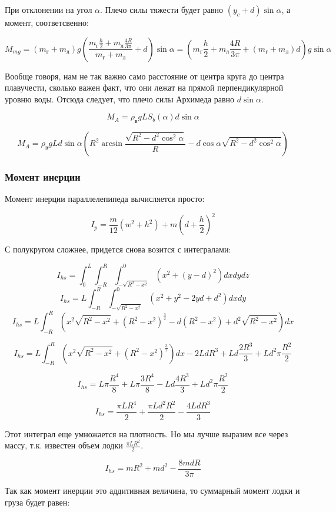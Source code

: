 \documentclass[12pt,a4paper]{article}
\begin{document}
При отклонении на угол $\alpha$. Плечо силы тяжести будет равно $(y_c+d)\sin\alpha$, а момент, соответсвенно:

$$ M_{mg} = (m_\text{г} + m_\text{л})g (\frac{m_\text{г}\frac{h}{2} + m_\text{л}\frac{4R}{3\pi}}{m_\text{г} + m_\text{л}} + d) \sin\alpha = (m_\text{г}\frac{h}{2} + m_\text{л}\frac{4R}{3\pi} + (m_\text{г} + m_\text{л})d)g\sin\alpha $$

Вообще говоря, нам не так важно само расстояние от центра круга до центра плавучести, сколько важен факт, что они лежат на прямой перпендикулярной уровню воды. Отсюда следует, что плечо силы Архимеда равно $d\sin\alpha$.

$$ M_A = \rho_\text{в}gLS_b(\alpha)d\sin\alpha $$

$$ M_A = \rho_\text{в}gLd\sin\alpha (R^2 \arcsin\frac{\sqrt{R^2-d^2\cos^2\alpha}}{R} - d\cos\alpha\sqrt{R^2-d^2\cos^2\alpha}) $$

\subsubsection{Момент инерции}

Момент инерции параллелепипеда вычисляется просто:

$$ I_p = \frac{m}{12}(w^2 + h^2) + m(d + \frac{h}{2})^2 $$

С полукругом сложнее, придется снова возится с интегралами:

$$ I_{hs} = \int_0^L \int_{-R}^{R} \int_{-\sqrt{R^2 - x^2}}^0 (x^2 + (y-d)^2) dx dy dz $$
$$ I_{hs} = L \int_{-R}^{R} \int_{-\sqrt{R^2 - x^2}}^0 (x^2 + y^2 -2yd + d^2) dx dy $$
$$ I_{hs} = L \int_{-R}^{R} (x^2 \sqrt{R^2 - x^2} + (R^2 - x^2)^\frac{3}{2} - d(R^2 - x^2) + d^2 \sqrt{R^2 - x^2}) dx $$

$$ I_{hs} = L \int_{-R}^{R} (x^2 \sqrt{R^2 - x^2} + (R^2 - x^2)^\frac{3}{2}) dx - 2LdR^3 + Ld\frac{2R^3}{3} + Ld^2\pi\frac{R^2}{2} $$

$$ I_{hs} = L\pi\frac{R^4}{8} + L\pi\frac{3R^4}{8} - Ld\frac{4R^3}{3} + Ld^2\pi\frac{R^2}{2} $$

$$ I_{hs} = \frac{\pi LR^4}{2} + \frac{\pi Ld^2R^2}{2} - \frac{4LdR^3}{3} $$

Этот интеграл еще умножается на плотность. Но мы лучше выразим все через массу, т.к. известен объем лодки $\frac{\pi LR^2}{2}$.

$$ I_{hs} = mR^2 + md^2 - \frac{8mdR}{3\pi}$$

Так как момент инерции это аддитивная величина, то суммарный момент лодки и груза будет равен:
\end{document}
